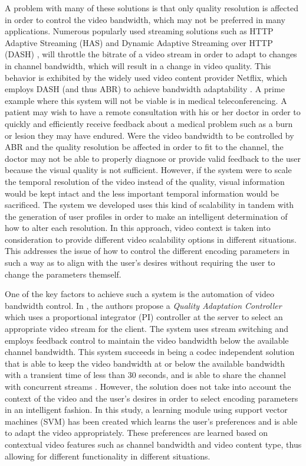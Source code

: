 \documentclass[preprint, 12pt]{elsarticle}
\begin{document}
A problem with many of these solutions is that only quality resolution is affected in order to control the video bandwidth, which may not be preferred in many applications. Numerous popularly used streaming solutions such as HTTP Adaptive Streaming (HAS) \cite{HASQoE} and Dynamic Adaptive Streaming over HTTP (DASH) \cite{DASH},  will throttle the bitrate of a video stream in order to adapt to changes in channel bandwidth, which will result in a change in video quality. This behavior is exhibited by the widely used video content provider Netflix, which employs DASH (and thus ABR) to achieve bandwidth adaptability \cite{Netflix}. A prime example where this system will not be viable is in medical teleconferencing. A patient may wish to have a remote consultation with his or her doctor in order to quickly and efficiently receive feedback about a medical problem such as a burn or lesion they may have endured. Were the video bandwidth to be controlled by ABR and the quality resolution be affected in order to fit to the channel, the doctor may not be able to properly diagnose or provide valid feedback to the user because the visual quality is not sufficient. However, if the system were to scale the temporal resolution of the video instead of the quality, visual information would be kept intact and the less important temporal information would be sacrificed. The system we developed uses this kind of scalability in tandem with the generation of user profiles in order to make an intelligent determination of how to alter each resolution. In this approach, video context is taken into consideration to provide different video scalability options in different situations. This addresses the issue of how to control the different encoding parameters in such a way as to align with the user’s desires without requiring the user to change the parameters themself.

One of the key factors to achieve such a system is the automation of video bandwidth control. In \cite{FeedbackControl}, the authors propose a \emph{Quality Adaptation Controller} which uses a proportional integrator (PI) controller at the server to select an appropriate video stream for the client. The system uses stream switching and employs feedback control to maintain the video bandwidth below the available channel bandwidth. This system succeeds in being a codec independent solution that is able to keep the video bandwidth at or below the available bandwidth with a transient time of less than 30 seconds, and is able to share the channel with concurrent streams \cite{FeedbackControl}. However, the solution does not take into account the context of the video and the user’s desires in order to select encoding parameters in an intelligent fashion. In this study, a learning module using support vector machines (SVM) has been created which learns the user’s preferences and is able to adapt the video appropriately. These preferences are learned based on contextual video features such as channel bandwidth and video content type, thus allowing for different functionality in different situations.
\end{document}
